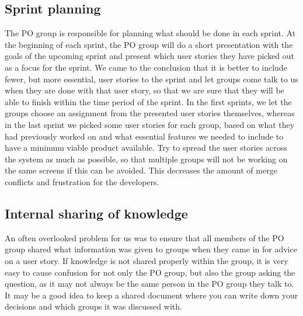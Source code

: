 \subsection{Sprint planning}
The PO group is responsible for planning what should be done in each sprint.
At the beginning of each sprint, the PO group will do a short presentation with the goals of the upcoming sprint and present which user stories they have picked out as a focus for the sprint.
We came to the conclusion that it is better to include fewer, but more essential, user stories to the sprint and let groups come talk to us when they are done with that user story, so that we are sure that they will be able to finish within the time period of the sprint.
In the first sprints, we let the groups choose an assignment from the presented user stories themselves, whereas in the last sprint we picked some user stories for each group, based on what they had previously worked on and what essential features we needed to include to have a minimum viable product available.
Try to spread the user stories across the system as much as possible, so that multiple groups will not be working on the same screens if this can be avoided. This decreases the amount of merge conflicts and frustration for the developers.

\subsection{Internal sharing of knowledge}
An often overlooked problem for us was to ensure that all members of the PO group shared what information was given to groups when they came in for advice on a user story.
If knowledge is not shared properly within the group, it is very easy to cause confusion for not only the PO group, but also the group asking the question, as it may not always be the same person in the PO group they talk to.
It may be a good idea to keep a shared document where you can write down your decisions and which groups it was discussed with.
